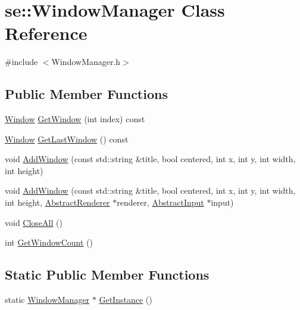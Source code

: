 \hypertarget{classse_1_1_window_manager}{}\section{se\+:\+:Window\+Manager Class Reference}
\label{classse_1_1_window_manager}


{\ttfamily \#include $<$Window\+Manager.\+h$>$}

\subsection*{Public Member Functions}
\begin{DoxyCompactItemize}
\item 
\mbox{\hyperlink{classse_1_1_window}{Window}} \mbox{\hyperlink{classse_1_1_window_manager_a67832360bad70a60d2241d5601bdde3a}{Get\+Window}} (int index) const
\item 
\mbox{\hyperlink{classse_1_1_window}{Window}} \mbox{\hyperlink{classse_1_1_window_manager_a9c1f1c2a077560a86a7c285291855dbe}{Get\+Last\+Window}} () const
\item 
void \mbox{\hyperlink{classse_1_1_window_manager_a49c863f687b26c958c02b6f0a3cc9af6}{Add\+Window}} (const std\+::string \&title, bool centered, int x, int y, int width, int height)
\item 
void \mbox{\hyperlink{classse_1_1_window_manager_aeee5f919f5395aa866e0d0cd06e3e5c3}{Add\+Window}} (const std\+::string \&title, bool centered, int x, int y, int width, int height, \mbox{\hyperlink{classse_1_1_abstract_renderer}{Abstract\+Renderer}} $\ast$renderer, \mbox{\hyperlink{classse_1_1_abstract_input}{Abstract\+Input}} $\ast$input)
\item 
void \mbox{\hyperlink{classse_1_1_window_manager_ae9106e9a62fa38456da31055f3a663ea}{Close\+All}} ()
\item 
int \mbox{\hyperlink{classse_1_1_window_manager_aec9f7b4a351181abd1a9963a33494614}{Get\+Window\+Count}} ()
\end{DoxyCompactItemize}
\subsection*{Static Public Member Functions}
\begin{DoxyCompactItemize}
\item 
static \mbox{\hyperlink{classse_1_1_window_manager}{Window\+Manager}} $\ast$ \mbox{\hyperlink{classse_1_1_window_manager_ac3c111c7a70c25d2f49b4f6573e87a48}{Get\+Instance}} ()
\end{DoxyCompactItemize}


